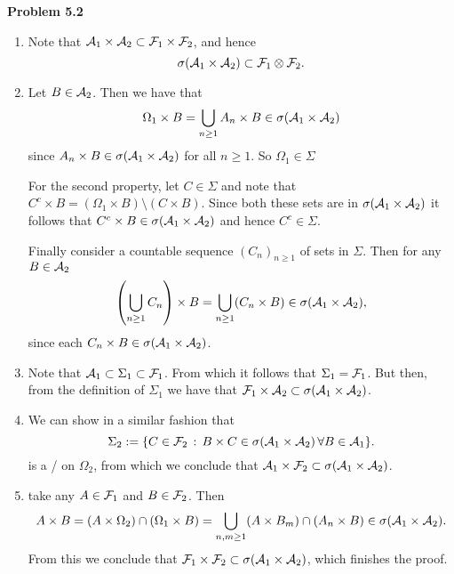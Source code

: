 
\textbf{Problem 5.2}
\begin{enumerate}[label={(\alph*)}]
\item Note that $\mathcal A_1 \times \mathcal A_2 \subset \mathcal F_1 \times \mathcal F_2$, and hence
\[
	\sigma(\mathcal A_1 \times \mathcal A_2) \subset \mathcal F_1 \otimes \mathcal F_2.
\]
\item Let $B \in \mathcal A_2$. Then we have that
\[
	\Omega_1 \times B = \bigcup_{n \ge 1} A_n \times B \in \sigma(\mathcal A_1 \times \mathcal A_2) 
\]
since $A_n \times B \in \sigma(\mathcal A_1 \times \mathcal A_2)$ for all $n \ge 1$. So $\Omega_1 \in \Sigma$

For the second property, let $C \in \Sigma$ and note that $C^c \times B = (\Omega_1 \times B) \setminus (C \times B)$.
Since both these sets are in $\sigma(\mathcal A_1 \times \mathcal A_2)$ it follows that $C^c \times B \in \sigma(\mathcal A_1 \times \mathcal A_2)$ and hence $C^c \in \Sigma$.

Finally consider a countable sequence $(C_n)_{n \ge 1}$ of sets in $\Sigma$. Then for any $B \in \mathcal A_2$
\[
	\left(\bigcup_{n \ge 1} C_n \right) \times B = \bigcup_{n \ge 1} (C_n \times B) \in \sigma(\mathcal A_1 \times \mathcal A_2),
\]
since each $C_n \times B \in \sigma(\mathcal A_1 \times \mathcal A_2)$.
\item Note that $\mathcal A_1 \subset \Sigma_1 \subset \mathcal F_1$. From which it follows that $\Sigma_1 = \mathcal F_1$. But then, from the definition of $\Sigma_1$ we have that $\mathcal F_1 \times \mathcal A_2 \subset \sigma(\mathcal A_1 \times \mathcal A_2)$.
\item We can show in a similar fashion that
\[
	\Sigma_2 := \{C \in \mathcal F_2 \, : \, B \times C \in \sigma(\mathcal A_1 \times \mathcal A_2) \, \forall B \in \mathcal A_1\}.
\]
is a \sigalg/ on $\Omega_2$, from which we conclude that $\mathcal A_1 \times \mathcal F_2 \subset \sigma(\mathcal A_1 \times \mathcal A_2)$.
\item take any $A \in \mathcal F_1$ and $B \in \mathcal F_2$. Then
\[
	A \times B = (A \times \Omega_2) \cap (\Omega_1 \times B) = \bigcup_{n,m \ge 1} (A \times B_m) \cap (A_n \times B) \in \sigma(\mathcal A_1 \times \mathcal A_2).
\]
From this we conclude that $\mathcal F_1 \times \mathcal F_2 \subset \sigma(\mathcal A_1 \times \mathcal A_2)$, which finishes the proof.
\end{enumerate}

\bigskip

